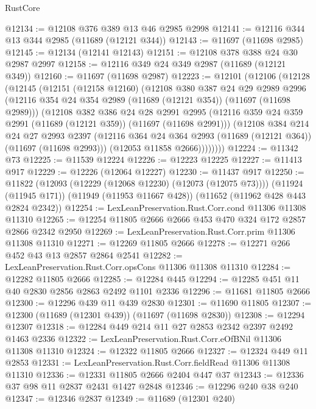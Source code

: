 \begin{lexlean}{RustCore}
\begin{coremodule}
@12134 := @12108 @376 @389 @13 @46 @2985 @2998
@12141 := @12116 @344 @13 @344 @2985 (@11689 (@12121 @344))
@12143 := @11697 (@11698 @2985)
@12145 := @12134 (@12141 @12143)
@12151 := @12108 @378 @388 @24 @30 @2987 @2997
@12158 := @12116 @349 @24 @349 @2987 (@11689 (@12121 @349))
@12160 := @11697 (@11698 @2987)
@12223 := @12101
    (@12106
      (@12128
        (@12145
          (@12151
            (@12158 @12160)
            (@12108
              @380
              @387
              @24
              @29
              @2989
              @2996
              (@12116 @354 @24 @354 @2989 (@11689 (@12121 @354)) (@11697 (@11698 @2989)))
              (@12108
                @382
                @386
                @24
                @28
                @2991
                @2995
                (@12116 @359 @24 @359 @2991 (@11689 (@12121 @359)) (@11697 (@11698 @2991)))
                (@12108
                  @384
                  @214
                  @24
                  @27
                  @2993
                  @2397
                  (@12116 @364 @24 @364 @2993 (@11689 (@12121 @364)) (@11697 (@11698 @2993)))
                  (@12053 @11858 @2666))))))))
@12224 := @11342 @73
@12225 := @11539 @12224
@12226 := @12223 @12225
@12227 := @11413 @917
@12229 := @12226 (@12064 @12227)
@12230 := @11437 @917
@12250 := @11822
    (@12093 (@12229 (@12068 @12230) (@12073 (@12075 @73))))
    (@11924 (@11945 @171))
    (@11949 (@11953 @11667 @428))
    (@11652 (@11962 @428 @443 @2824 @2342))
@12254 := LexLeanPreservation.Rust.Corr.cond @11306 @11308 @11310
@12265 := @12254 @11805 @2666 @2666 @453 @470 @324 @172 @2857 @2866 @2342 @2950
@12269 := LexLeanPreservation.Rust.Corr.prim @11306 @11308 @11310
@12271 := @12269 @11805 @2666
@12278 := @12271 @266 @452 @43 @13 @2857 @2864 @2541
@12282 := LexLeanPreservation.Rust.Corr.opsCons @11306 @11308 @11310
@12284 := @12282 @11805 @2666
@12285 := @12284 @445
@12294 := @12285 @451 @11 @40 @2830 @2856 @2863 @2492 @1101 @2336
@12296 := @11681 @11805 @2666
@12300 := @12296 @439 @11 @439 @2830
@12301 := @11690 @11805
@12307 := @12300 (@11689 (@12301 @439)) (@11697 (@11698 @2830))
@12308 := @12294 @12307
@12318 := @12284 @449 @214 @11 @27 @2853 @2342 @2397 @2492 @1463 @2336
@12322 := LexLeanPreservation.Rust.Corr.eOfBNil @11306 @11308 @11310
@12324 := @12322 @11805 @2666
@12327 := @12324 @449 @11 @2853
@12331 := LexLeanPreservation.Rust.Corr.fieldRead @11306 @11308 @11310
@12336 := @12331 @11805 @2666 @2404 @447 @37
@12343 := @12336 @37 @98 @11 @2837 @2431 @1427 @2848
@12346 := @12296 @240 @38 @240
@12347 := @12346 @2837
@12349 := @11689 (@12301 @240)

\end{coremodule}
\end{lexlean}

